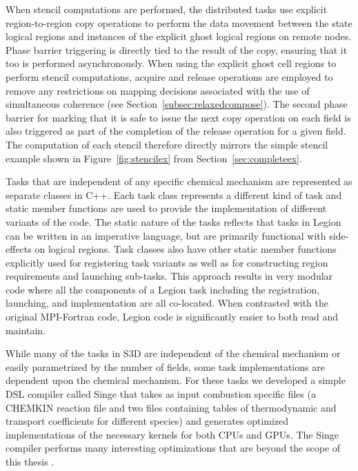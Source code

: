 When stencil computations are performed, the distributed
tasks use explicit region-to-region copy operations to
perform the data movement between the state logical regions
and instances of the explicit ghost logical regions on 
remote nodes. Phase barrier triggering is directly tied to
the result of the copy, ensuring that it too is performed
asynchronously. When using the explicit ghost cell regions
to perform stencil computations, acquire and release operations
are employed to remove any restrictions on mapping decisions
associated with the use of simultaneous coherence (see
Section~\ref{subsec:relaxedcompose}). The second phase barrier
for marking that it is safe to issue the next copy operation
on each field is also triggered as part of the completion 
of the release operation for a given field. The computation
of each stencil therefore directly mirrors the simple
stencil example shown in Figure~\ref{fig:stencilex} from
Section~\ref{sec:completeex}.

Tasks that are independent of any specific chemical 
mechanism are represented as separate classes in C++. Each 
task class represents a different kind of task and 
static member functions are used to provide the implementation
of different variants of the code. The static nature of
the tasks reflects that tasks in Legion can be written in 
an imperative language, but are primarily functional with
side-effects on logical regions. Task classes also have
other static member functions explicitly used for registering
task variants as well as for constructing region requirements
and launching sub-tasks. This approach results in very
modular code where all the components of a Legion task
including the registration, launching, and implementation
are all co-located. When contrasted with the original
MPI-Fortran code, Legion code is significantly easier to
both read and maintain.

While many of the tasks in S3D are independent of the 
chemical mechanism or easily parametrized by the number
of fields, some task implementations are dependent upon
the chemical mechanism. For these tasks we developed a 
simple DSL compiler called Singe that takes as input
combustion specific files (a CHEMKIN reaction file and 
two files containing tables of thermodynamic and transport 
coefficients for different species) and generates optimized
implementations of the necessary kernels for both CPUs
and GPUs. The Singe compiler performs many interesting
optimizations that are beyond the scope of this 
thesis \cite{Singe14}.


